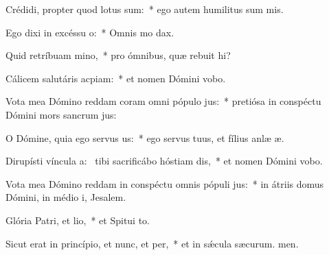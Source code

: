 \item Crédidi, propter quod lotus sum:~* ego autem humilitus sum mis.
\item Ego dixi in excéssu o:~* Omnis mo dax.
\item Quid retríbuam mino,~* pro ómnibus, quæ rebuit hi?
\item Cálicem salutáris acpiam:~* et nomen Dómini vobo.
\item Vota mea Dómino reddam coram omni pópulo jus:~* pretiósa in conspéctu Dómini mors sancrum jus:
\item O Dómine, quia ego servus us:~* ego servus tuus, et fílius anlæ æ.
\item Dirupísti víncula a:~\pscross{} tibi sacrificábo hóstiam dis,~* et nomen Dómini vobo.
\item Vota mea Dómino reddam in conspéctu omnis pópuli jus:~* in átriis domus Dómini, in médio i, Jesalem.
\item Glória Patri, et lio,~* et Spitui to.
\item Sicut erat in princípio, et nunc, et per,~* et in sǽcula sæcurum. men.
